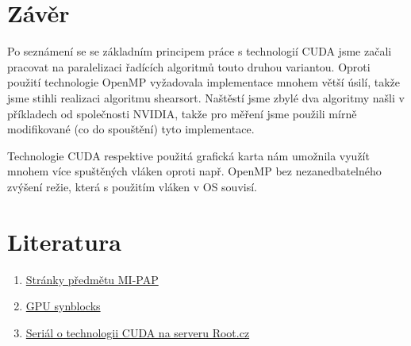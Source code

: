 \documentclass[12pt]{article}
\begin{document}
\section{Závěr}
Po seznámení se se základním principem práce s technologií CUDA jsme začali pracovat na paralelizaci řadících algoritmů touto druhou variantou. Oproti použití technologie OpenMP vyžadovala implementace mnohem větší úsilí, takže jsme stihli realizaci algoritmu shearsort. Naštěstí jsme zbylé dva algoritmy našli v příkladech od společnosti NVIDIA, takže pro měření jsme použili mírně modifikované (co do spouštění) tyto implementace.

Technologie CUDA respektive použitá grafická karta nám umožnila využít mnohem více spuštěných vláken oproti např. OpenMP bez nezanedbatelného zvýšení režie, která s použitím vláken v OS souvisí. 
\section{Literatura}
\begin{enumerate}
\item \href{https://edux.fit.cvut.cz/courses/MI-PAP}{Stránky předmětu MI-PAP}
\item \href{http://aggregate.org/MAGIC/#GPU SyncBlocks}{\label{cud:synblocks}GPU synblocks}
\item \href{http://www.root.cz/serialy/uvod-do-technologie-cuda/}{Seriál o technologii CUDA na serveru Root.cz}
\end{enumerate}
\end{document}
